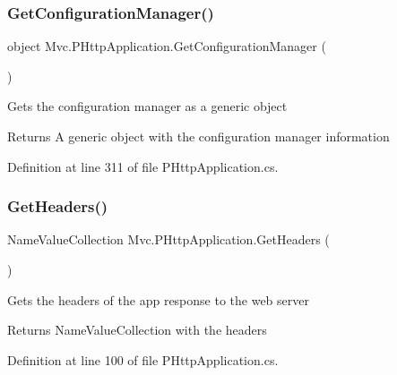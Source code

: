 \mbox{\label{class_mvc_1_1_p_http_application_a9dc63c8a87637cf4ffdf3ec78f3261a2}} 
\subsubsection{\texorpdfstring{Get\+Configuration\+Manager()}{GetConfigurationManager()}}
{\footnotesize\ttfamily object Mvc.\+P\+Http\+Application.\+Get\+Configuration\+Manager (\begin{DoxyParamCaption}{ }\end{DoxyParamCaption})}



Gets the configuration manager as a generic object 

\begin{DoxyReturn}{Returns}
A generic object with the configuration manager information
\end{DoxyReturn}


Definition at line 311 of file P\+Http\+Application.\+cs.

\mbox{\label{class_mvc_1_1_p_http_application_ae520dc0bf0c265e6c7114d918f9aa6a0}} 
\subsubsection{\texorpdfstring{Get\+Headers()}{GetHeaders()}}
{\footnotesize\ttfamily Name\+Value\+Collection Mvc.\+P\+Http\+Application.\+Get\+Headers (\begin{DoxyParamCaption}{ }\end{DoxyParamCaption})}



Gets the headers of the app response to the web server 

\begin{DoxyReturn}{Returns}
Name\+Value\+Collection with the headers
\end{DoxyReturn}


Definition at line 100 of file P\+Http\+Application.\+cs.

